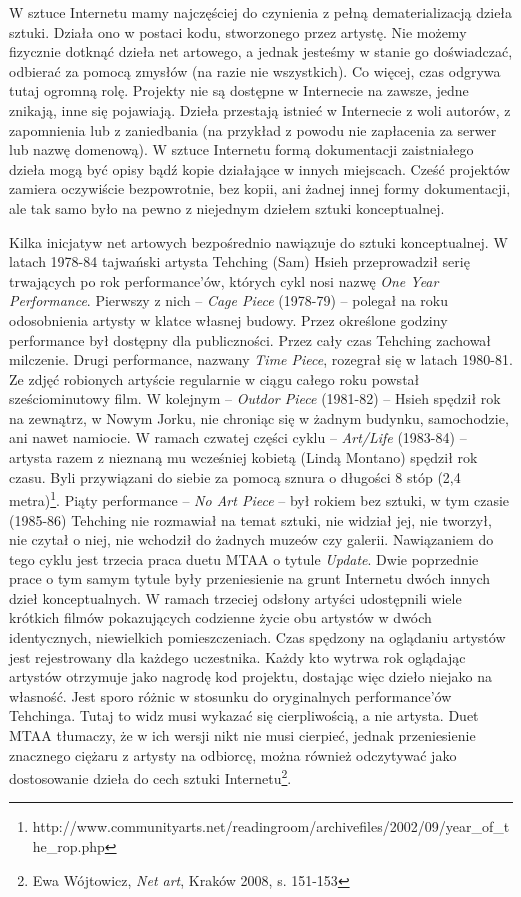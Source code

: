 \documentclass[a4paper,12pt,twoside]{article}
\begin{document}
W sztuce Internetu mamy najczęściej do czynienia z pełną dematerializacją
dzieła sztuki. Działa ono w postaci kodu, stworzonego przez artystę.
Nie możemy fizycznie dotknąć dzieła net artowego, a jednak jesteśmy w stanie
go doświadczać, odbierać za pomocą zmysłów (na razie nie wszystkich).
Co więcej, czas odgrywa tutaj ogromną rolę. Projekty nie są dostępne
w Internecie na zawsze, jedne znikają, inne się pojawiają. Dzieła przestają
istnieć w Internecie z woli autorów, z zapomnienia lub z zaniedbania (na
przykład z powodu nie zapłacenia za serwer lub nazwę domenową). W sztuce
Internetu formą dokumentacji zaistniałego dzieła mogą być opisy bądź kopie
działające w innych miejscach. Cześć projektów zamiera oczywiście bezpowrotnie,
bez kopii, ani żadnej innej formy dokumentacji, ale tak samo było na pewno
z niejednym dziełem sztuki konceptualnej.

Kilka inicjatyw net artowych bezpośrednio nawiązuje do sztuki konceptualnej.
W latach 1978-84 tajwański artysta
Tehching (Sam) Hsieh przeprowadził serię trwających po rok
performance'ów, których cykl nosi nazwę \textit{One Year Performance}.
Pierwszy z nich -- \textit{Cage Piece} (1978-79) -- polegał na roku
odosobnienia artysty w klatce własnej budowy. Przez określone godziny
performance był dostępny dla publiczności. Przez cały czas Tehching zachował
milczenie. Drugi performance, nazwany \textit{Time Piece}, rozegrał się
w latach 1980-81. Ze zdjęć robionych artyście regularnie w ciągu całego roku
powstał sześciominutowy film. W kolejnym -- \textit{Outdor Piece} (1981-82) --
Hsieh spędził rok na zewnątrz, w Nowym Jorku, nie chroniąc się w żadnym
budynku, samochodzie, ani nawet namiocie. W ramach czwatej części cyklu --
\textit{Art/Life} (1983-84) -- artysta razem z nieznaną mu wcześniej kobietą
(Lindą Montano) spędził rok czasu. Byli przywiązani do siebie za pomocą
sznura o długości 8 stóp
(2,4 metra)\footnote{http://www.communityarts.net/readingroom/archivefiles/2002/09/year\_of\_the\_rop.php}.
Piąty performance -- \textit{No Art Piece} -- był rokiem bez sztuki,
w tym czasie (1985-86) Tehching nie rozmawiał na temat sztuki, nie widział jej,
nie tworzył, nie czytał o niej, nie wchodził do żadnych muzeów czy galerii.
Nawiązaniem do tego cyklu jest trzecia praca duetu MTAA o tytule
\textit{Update}. Dwie poprzednie prace o tym samym tytule były przeniesienie
na grunt Internetu dwóch innych dzieł konceptualnych. W ramach trzeciej
odsłony artyści udostępnili wiele krótkich filmów pokazujących
codzienne życie obu artystów w dwóch identycznych, niewielkich pomieszczeniach.
Czas spędzony na oglądaniu artystów jest rejestrowany dla każdego uczestnika.
Każdy kto wytrwa rok oglądając artystów otrzymuje jako nagrodę kod
projektu, dostając więc dzieło niejako na własność. Jest sporo różnic
w stosunku do oryginalnych performance'ów Tehchinga. Tutaj to widz musi
wykazać się cierpliwością, a nie artysta. Duet MTAA tłumaczy, że w ich wersji
nikt nie musi cierpieć, jednak przeniesienie znacznego ciężaru z artysty
na odbiorcę, można również odczytywać jako dostosowanie dzieła do cech
sztuki Internetu\footnote{Ewa Wójtowicz, \textit{Net art}, Kraków 2008,
s. 151-153}.
\end{document}
